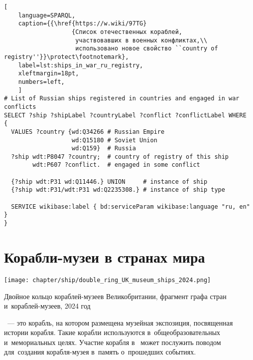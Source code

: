 \begin{lstlisting}[ 
    language=SPARQL, 
    caption={{\href{https://w.wiki/97TG}
                   {Список отечественных кораблей, 
                    участвовавших в военных конфликтах,\\
                    использовано новое свойство ``country of registry''}}\protect\footnotemark}, 
    label=lst:ships_in_war_ru_registry,
    xleftmargin=18pt, 
    numbers=left,
    ]
# List of Russian ships registered in countries and engaged in war conflicts
SELECT ?ship ?shipLabel ?countryLabel ?conflict ?conflictLabel WHERE
{
  VALUES ?country {wd:Q34266 # Russian Empire
                   wd:Q15180 # Soviet Union
                   wd:Q159}  # Russia
  ?ship wdt:P8047 ?country;  # country of registry of this ship
        wdt:P607 ?conflict.  # engaged in some conflict
  
  {?ship wdt:P31 wd:Q11446.} UNION     # instance of ship
  {?ship wdt:P31/wdt:P31 wd:Q2235308.} # instance of ship type
  
  SERVICE wikibase:label { bd:serviceParam wikibase:language "ru, en" }
}
\end{lstlisting}













\section{Корабли-музеи в странах мира}

\begin{marginfigure}[0\baselineskip]
  \texttt{[image: chapter/ship/double\_ring\_UK\_museum\_ships\_2024.png]}
  \caption{Двойное кольцо кораблей-музеев Великобритании, 
           фрагмент графа стран и~кораблей-музеев, 2024 год}
  \label{fig:double-ring-UK-museum-ships}%
\end{marginfigure}%

~--- это корабль, 
на котором размещена музейная экспозиция, посвященная истории корабля. 
Такие корабли используются в~общеобразовательных и~мемориальных целях. 
Участие корабля в~ может послужить поводом 
для~создания корабля-музея в~память о~прошедших событиях. 


